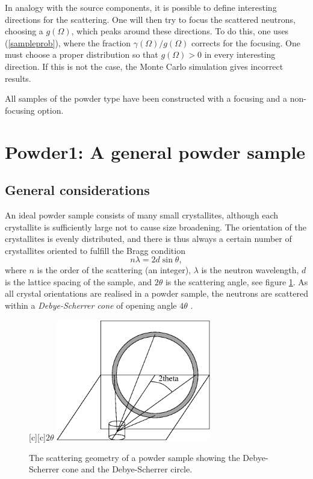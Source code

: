 In analogy with the source components, it is possible to define
interesting directions for the scattering.
One will then try to focus the scattered neutrons,
choosing a $g(\Omega)$, which peaks around these directions.
To do this, one uses (\ref{sampleprob}), where the
fraction $\gamma(\Omega)/g(\Omega)$ corrects for the focusing.
One must choose a proper distribution so that
$g(\Omega) > 0$ in every interesting direction. If this is not the
case, the Monte Carlo simulation gives incorrect results.

All samples of the powder type have been constructed with a focusing
and a non-focusing option.


\section{Powder1: A general powder sample}
\subsection{General considerations}
An ideal powder sample consists of many small
crystallites, although each crystallite is sufficiently
large not to cause size broadening.
The orientation of the crystallites is evenly distributed,
and there is thus always a certain number of
crystallites oriented to fulfill the Bragg condition
\begin{equation}   \label{Bragg}
n \lambda = 2 d \sin \theta ,
\end{equation}
where $n$ is the order of the scattering (an integer), $\lambda$
is the neutron wavelength, $d$ is the lattice spacing of the sample,
and $2 \theta$ is the scattering angle, see figure \ref{coneFig}.
As all crystal orientations
are realised in a powder sample, the neutrons are scattered within a
{\em Debye-Scherrer cone} of opening angle $4 \theta$ \cite{bacon}.

\begin{figure}
  \begin{center}
    [c][c]{$2\theta$}
    \includegraphics[width=0.6\textwidth]{figures/powder.eps}
  \end{center}
\caption{The scattering geometry of a powder sample showing the
Debye-Scherrer cone and the Debye-Scherrer circle.}
\label{coneFig}
\end{figure}

